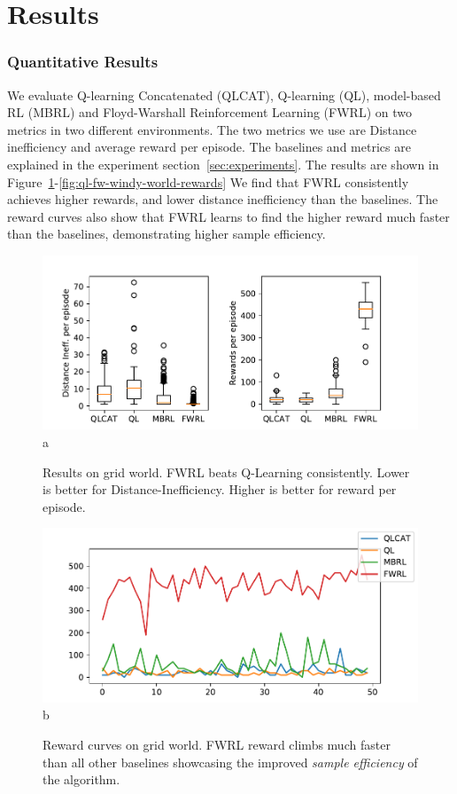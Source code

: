 \section{Results}
\subsubsection{Quantitative Results}
We evaluate Q-learning Concatenated (QLCAT), Q-learning (QL), model-based RL
(MBRL) and Floyd-Warshall Reinforcement Learning (FWRL) on two metrics in two
different environments. The two metrics we use are Distance inefficiency and
average reward per episode. The baselines and metrics are explained in the
experiment section~\ref{sec:experiments}. The results are shown in
Figure~\ref{fig:ql-fw-grid-world-results}-\ref{fig:ql-fw-windy-world-rewards} 
We find that FWRL consistently achieves higher rewards, and lower distance
inefficiency than the baselines. The reward curves also show that FWRL learns to
find the higher reward much faster than the baselines, demonstrating higher
sample efficiency.

\begin{figure}%
  \includegraphics[width=\columnwidth]{./media/metrics-grid-world.pdf}{a}
  \caption{Results on grid world. FWRL beats Q-Learning
    consistently. Lower is better for Distance-Inefficiency. Higher
    is better for reward per episode. }
  \label{fig:ql-fw-grid-world-results}%
\end{figure}

\begin{figure}
  \includegraphics[width=\columnwidth]{./media/rewards-metrics-grid-world.pdf}{b}
  \caption{Reward curves on grid world. FWRL reward climbs much
    faster than all other baselines showcasing the improved \emph{sample
      efficiency} of the algorithm.}
  \label{fig:ql-fw-grid-world-reward-curves}%
\end{figure}


